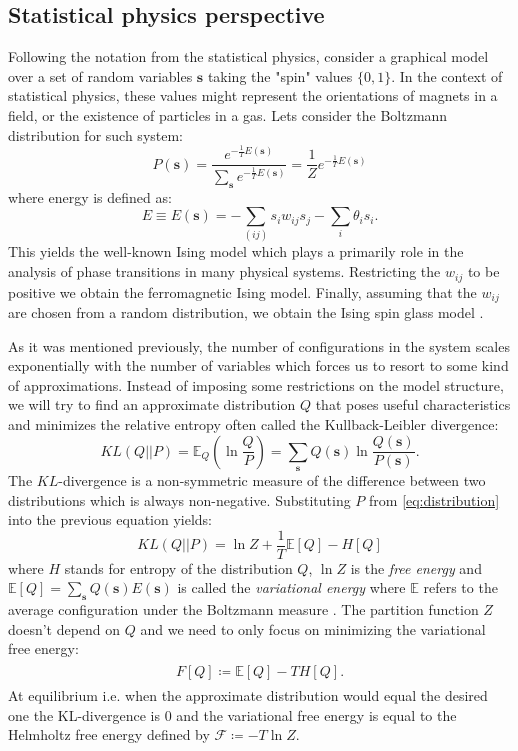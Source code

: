\subsection{Statistical physics perspective}
Following the notation from the statistical physics, consider a graphical model over a set of random variables $\mathbf{s}$ taking the "spin" values $\{0, 1 \}$. In the context of statistical physics, these values might represent the orientations of magnets in a field, or the existence of particles in a gas. Lets consider the Boltzmann distribution for such system:
\begin{equation}
P(\mathbf{s}) = \frac{ e^{-\frac{1}{T}E(\mathbf{s})}}{\sum_{\mathbf{s}} e^{-\frac{1}{T}E(\mathbf{s})}} = \frac{1}{Z}e^{-\frac{1}{T}E(\mathbf{s})}
\label{eq:distribution}
\end{equation}
where energy is defined as:
$$E \equiv E (\mathbf{s}) = - \sum_{(ij)} s_i w_{ij} s_j - \sum_i \theta_i s_i.$$
This yields the well-known Ising model which plays a primarily role in the analysis of phase transitions in many physical systems. Restricting the $w_{ij}$ to be positive we obtain the ferromagnetic Ising model. Finally, assuming that the $w_{ij}$ are chosen from a random distribution, we obtain the Ising spin glass model \cite{yedidia2001idiosyncratic}. 

As it was mentioned previously, the number of configurations in the system scales exponentially with the number of variables which forces us to resort to some kind of approximations. Instead of imposing some restrictions on the model structure, we will try to find an approximate distribution $Q$ that poses useful characteristics and minimizes the relative entropy often called the Kullback-Leibler divergence:
\begin{equation}
KL(Q || P)  = \mathbb{E}_{Q}\left( \ln \frac{Q}{P} \right) = \sum_{\mathbf{s}} Q(\mathbf{s}) \ln \frac{Q(\mathbf{s})}{P(\mathbf{s})} .
\label{eq:kl}
\end{equation}
The $KL$-divergence is a non-symmetric measure of the difference between two distributions which is always non-negative. Substituting $P$ from \ref{eq:distribution} into the previous equation yields:
$$ KL(Q||P) = \ln Z + \frac{1}{T}\mathbb{E}[Q] - H[Q]$$
where $H$ stands for entropy of the distribution $Q$, $\ln Z$ is the \emph{free energy} and $\mathbb{E}[Q] = \sum_{\mathbf{s}} Q(\mathbf{s})E(\mathbf{s})$ is called the \emph{variational energy} where $\mathbb{E}$ refers to the average configuration under the Boltzmann measure \cite{opper2001advanced}. The partition function $Z$ doesn't depend on $Q$ and we need to only focus on minimizing the variational free energy:
\begin{align}
\begin{split}
F[Q]  \coloneqq \mathbb{E}[Q] - TH[Q].
\label{eq:gibbsFreeEnergy}
\end{split}
\end{align}
At equilibrium i.e. when the approximate distribution would equal the desired one the KL-divergence is $0$ and the variational free energy is equal to the Helmholtz free energy defined by 
$\mathcal{F} \coloneqq -T \ln Z$. 

